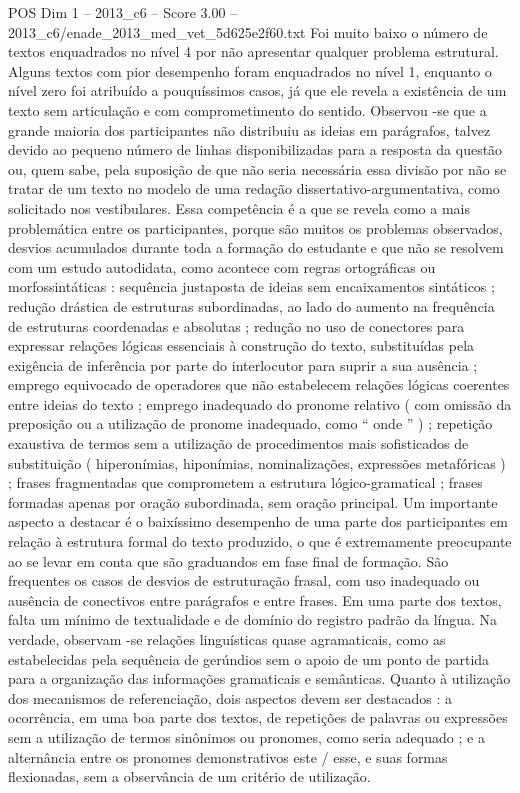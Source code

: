 \begin{textsample}{POS Dim 1 – 2013\_c6 – Score 3.00 – 2013\_c6/enade\_2013\_med\_vet\_5d625e2f60.txt}
Foi muito baixo o número de textos enquadrados no nível 4 por não apresentar qualquer problema estrutural.
Alguns textos com pior desempenho foram enquadrados no nível 1, enquanto o nível zero foi atribuído a pouquíssimos casos, já que ele revela a existência de um texto sem articulação e com comprometimento do sentido.
Observou -se que a grande maioria dos participantes não distribuiu as ideias em parágrafos, talvez devido ao pequeno número de linhas disponibilizadas para a resposta da questão ou, quem sabe, pela suposição de que não seria necessária essa divisão por não se tratar de um texto no modelo de uma redação dissertativo-argumentativa, como solicitado nos vestibulares.
Essa competência é a que se revela como a mais problemática entre os participantes, porque são muitos os problemas observados, desvios acumulados durante toda a formação do estudante e que não se resolvem com um estudo autodidata, como acontece com regras ortográficas ou morfossintáticas : sequência justaposta de ideias sem encaixamentos sintáticos ; redução drástica de estruturas subordinadas, ao lado do aumento na frequência de estruturas coordenadas e absolutas ; redução no uso de conectores para expressar relações lógicas essenciais à construção do texto, substituídas pela exigência de inferência por parte do interlocutor para suprir a sua ausência ; emprego equivocado de operadores que não estabelecem relações lógicas coerentes entre ideias do texto ; emprego inadequado do pronome relativo ( com omissão da preposição ou a utilização de pronome inadequado, como “ onde ” ) ; repetição exaustiva de termos sem a utilização de procedimentos mais sofisticados de substituição ( hiperonímias, hiponímias, nominalizações, expressões metafóricas ) ; frases fragmentadas que comprometem a estrutura lógico-gramatical ; frases formadas apenas por oração subordinada, sem oração principal.
Um importante aspecto a destacar é o baixíssimo desempenho de uma parte dos participantes em relação à estrutura formal do texto produzido, o que é extremamente preocupante ao se levar em conta que são graduandos em fase final de formação.
São frequentes os casos de desvios de estruturação frasal, com uso inadequado ou ausência de conectivos entre parágrafos e entre frases.
Em uma parte dos textos, falta um mínimo de textualidade e de domínio do registro padrão da língua.
Na verdade, observam -se relações linguísticas quase agramaticais, como as estabelecidas pela sequência de gerúndios sem o apoio de um ponto de partida para a organização das informações gramaticais e semânticas.
Quanto à utilização dos mecanismos de referenciação, dois aspectos devem ser destacados : a ocorrência, em uma boa parte dos textos, de repetições de palavras ou expressões sem a utilização de termos sinônimos ou pronomes, como seria adequado ; e a alternância entre os pronomes demonstrativos este / esse, e suas formas flexionadas, sem a observância de um critério de utilização.

\end{textsample}
